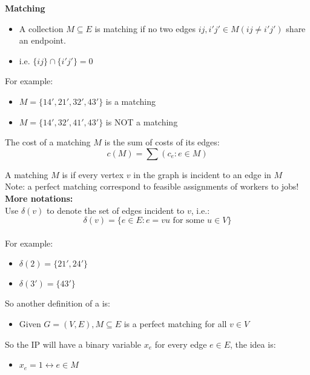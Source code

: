 \documentclass[letterpaper, 12pt]{article}
\newcommand{\red}[1]{{\color{red}{#1}}}
\begin{document}
    \textbf{Matching}
    \begin{itemize}
        \item A collection $M \subseteq E$ is matching if no two edges $ij, i'j' \in M (ij \neq i'j')$ share an endpoint.
        \item i.e. $\{ij\} \cap \{i'j'\} = 0$
    \end{itemize}
    For example:
    \begin{itemize}
        \item $M = \{14', 21', 32', 43'\}$ is a matching
        \item $M = \{14', 32', 41', 43'\}$ is NOT a matching
    \end{itemize}

    The cost of a matching $M$ is the sum of costs of its edges:
    $$c(M) = \sum (c_e : e \in M)$$

    A matching $M$ is \red{perfect} if every vertex $v$ in the graph is incident to an edge in $M$\\
    Note: a perfect matching correspond to feasible assignments of workers to jobs!\\
    \bigskip
    \textbf{More notations:}\\
    Use $\delta(v)$ to denote the set of edges incident to $v$, i.e.:
    $$ \delta(v) = \{e \in E : e = vu \text{ for some } u \in V\}$$
    \red{This definition is improved later!}\\
    For example:\\
    \begin{itemize}
        \item $\delta(2) = \{21', 24'\}$
        \item $\delta(3') = \{43'\}$
    \end{itemize}
    \pagebreak
    So another definition of a \red{perfect matching} is:
    \begin{itemize}
        \item Given $G = (V,E), M \subseteq E$ is a perfect matching \red{iff $M \cap \delta(v)$ contains a single edge} for all $v \in V$
    \end{itemize}

    So the IP will have a binary variable $x_e$ for every edge $e \in E$, the idea is:\\
    \begin{itemize}
        \item $x_e = 1 \longleftrightarrow e \in M$
    \end{itemize}
\end{document}
